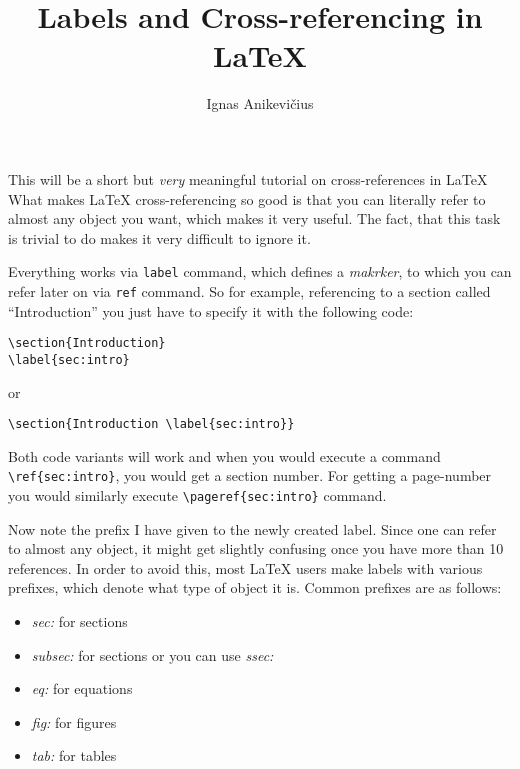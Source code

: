 \documentclass[
    draft
]{scrartcl}
\title{Labels and Cross-referencing in \LaTeX{}}
\author{Ignas Anikevičius}
\begin{document}
\maketitle

This will be a short but \emph{very} meaningful tutorial on cross-references in
\LaTeX{}
%
What makes \LaTeX{} cross-referencing so good is that you can literally refer to
    almost any object you want, which makes it very useful.
%
The fact, that this task is trivial to do makes it very difficult to ignore it.

%    
Everything works via \verb|label| command, which defines a \emph{makrker}, to
    which you can refer later on via \verb|ref| command.
%
So for example, referencing to a section called ``Introduction'' you just have
    to specify it with the following code:
%
\begin{lstlisting}
\section{Introduction}
\label{sec:intro}
\end{lstlisting}
%
or
%
\begin{lstlisting}
\section{Introduction \label{sec:intro}}
\end{lstlisting}
%
Both code variants will work and when you would execute a command
    \verb|\ref{sec:intro}|, you would get a section number.
%
For getting a page-number you would similarly execute 
    \verb|\pageref{sec:intro}| command.

%
Now note the prefix I have given to the newly created label.
%
Since one can refer to almost any object, it might get slightly confusing once
    you have more than 10 references.
%
In order to avoid this, most \LaTeX{} users make labels with various prefixes,
    which denote what type of object it is.
%
Common prefixes are as follows:
%
\begin{itemize}
    \item \emph{sec:} for sections
    \item \emph{subsec:} for sections or you can use \emph{ssec:}
    \item \emph{eq:} for equations
    \item \emph{fig:} for figures
    \item \emph{tab:} for tables
\end{itemize}
\end{document}
